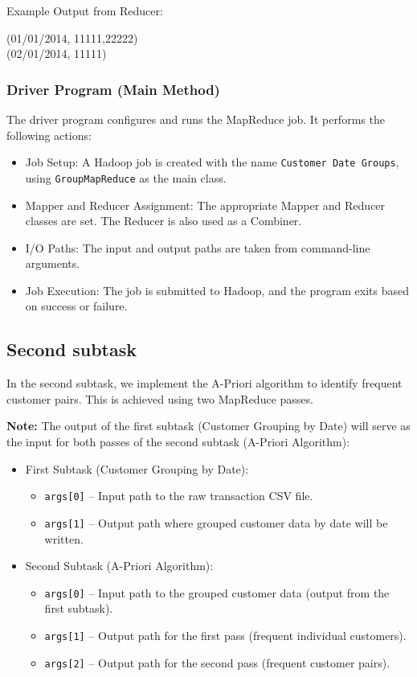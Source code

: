 Example Output from Reducer:
\begin{center}
(01/01/2014, 11111,22222)\\
(02/01/2014, 11111)
\end{center}

\subsubsection{Driver Program (Main Method)}

The driver program configures and runs the MapReduce job.
It performs the following actions:

\begin{itemize}
    \item Job Setup: A Hadoop job is created with the name \texttt{Customer Date Groups}, using \texttt{GroupMapReduce} as the main class.
    \item Mapper and Reducer Assignment: The appropriate Mapper and Reducer classes are set.
    The Reducer is also used as a Combiner.
    \item I/O Paths: The input and output paths are taken from command-line arguments.
    \item Job Execution: The job is submitted to Hadoop, and the program exits based on success or failure.
\end{itemize}

\subsection{Second subtask}
\label{subsec:second-subtask}

In the second subtask, we implement the A-Priori algorithm to identify frequent customer pairs.
This is achieved using two MapReduce passes.

\textbf{Note:} The output of the first subtask (Customer Grouping by Date) will serve as the input for both passes of the second subtask (A-Priori Algorithm):

\begin{itemize}
    \item First Subtask (Customer Grouping by Date):
    \begin{itemize}
        \item \texttt{args[0]} – Input path to the raw transaction CSV file.
        \item \texttt{args[1]} – Output path where grouped customer data by date will be written.
    \end{itemize}

    \item Second Subtask (A-Priori Algorithm):
    \begin{itemize}
        \item \texttt{args[0]} – Input path to the grouped customer data (output from the first subtask).
        \item \texttt{args[1]} – Output path for the first pass (frequent individual customers).
        \item \texttt{args[2]} – Output path for the second pass (frequent customer pairs).
    \end{itemize}
\end{itemize}

